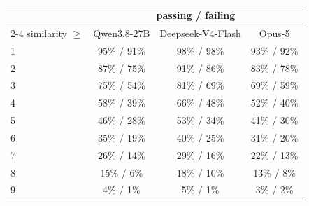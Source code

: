\begin{table}[h]
\centering
\small
\begin{tabular}{lccc}
\toprule
 & \multicolumn{3}{c}{passing / failing} \\
\cmidrule(lr){2-4}
similarity $\geq$ & Qwen3.8-27B & Deepseek-V4-Flash & Opus-5 \\
\midrule
1 & 95\% / 91\% & 98\% / 98\% & 93\% / 92\% \\
2 & 87\% / 75\% & 91\% / 86\% & 83\% / 78\% \\
3 & 75\% / 54\% & 81\% / 69\% & 69\% / 59\% \\
4 & 58\% / 39\% & 66\% / 48\% & 52\% / 40\% \\
5 & 46\% / 28\% & 53\% / 34\% & 41\% / 30\% \\
6 & 35\% / 19\% & 40\% / 25\% & 31\% / 20\% \\
7 & 26\% / 14\% & 29\% / 16\% & 22\% / 13\% \\
8 & 15\% / 6\% & 18\% / 10\% & 13\% / 8\% \\
9 & 4\% / 1\% & 5\% / 1\% & 3\% / 2\% \\
\bottomrule
\end{tabular}
\caption{}
\label{tab:matching_cutoffs}
\end{table}
